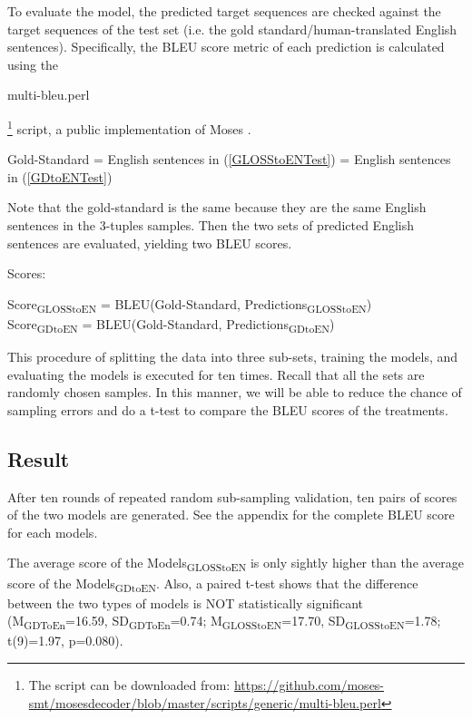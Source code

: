 \documentclass[11pt,a4paper]{article}
\begin{document}
To evaluate the model, the predicted target sequences are checked against the target sequences of the test set (i.e. the gold standard/human-translated English sentences).
Specifically, the BLEU score metric \citep{bleu} of each prediction is calculated using the \begin{myfont} multi-bleu.perl\end{myfont}\footnote{The script can be downloaded from: \url{https://github.com/moses-smt/mosesdecoder/blob/master/scripts/generic/multi-bleu.perl}}
script, a public implementation of Moses \citep{moses}. 
\begin{exe}
\ex Gold-Standard = English sentences in (\ref{GLOSStoENTest}) = English sentences in (\ref{GDtoENTest})
\end{exe}
Note that the gold-standard is the same because they are the same English sentences in the 3-tuples samples. Then the two sets of predicted English sentences are evaluated, yielding two BLEU scores.  

\begin{exe}
\ex Scores: \\
 \begin{xlist}
	\ex Score\textsubscript{GLOSStoEN} = BLEU(Gold-Standard, Predictions\textsubscript{GLOSStoEN}) \\
	\ex Score\textsubscript{GDtoEN} = BLEU(Gold-Standard, Predictions\textsubscript{GDtoEN}) \\
 \end{xlist}
\end{exe}
This procedure of splitting the data into three sub-sets, training the models, and evaluating the models is executed for ten times. Recall that all the sets are randomly chosen samples. In this manner, we will be able to reduce the chance of sampling errors and do a t-test to compare the BLEU scores of the treatments.  

\subsection{Result} \label{gdglen_results}
After ten rounds of repeated random sub-sampling validation, ten pairs of scores of the two models are generated. See the appendix for the complete BLEU score for each models.

The average score of the Models\textsubscript{GLOSStoEN} is only sightly higher than the average score of the Models\textsubscript{GDtoEN}.
Also, a paired t-test shows that the difference between the two types of models is NOT statistically significant
(M\textsubscript{GDToEn}=16.59, SD\textsubscript{GDToEn}=0.74; M\textsubscript{GLOSStoEN}=17.70, SD\textsubscript{GLOSStoEN}=1.78; t(9)=1.97, p=0.080). 
\end{document}
